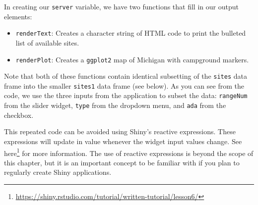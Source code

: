 \documentclass[
]{krantz}
\newenvironment{Shaded}{\begin{snugshade}}{\end{snugshade}}
\newcommand{\ControlFlowTok}[1]{\textcolor[rgb]{0.13,0.29,0.53}{\textbf{#1}}}
\newcommand{\DecValTok}[1]{\textcolor[rgb]{0.00,0.00,0.81}{#1}}
\newcommand{\KeywordTok}[1]{\textcolor[rgb]{0.13,0.29,0.53}{\textbf{#1}}}
\newcommand{\NormalTok}[1]{#1}
\newcommand{\OperatorTok}[1]{\textcolor[rgb]{0.81,0.36,0.00}{\textbf{#1}}}
\newcommand{\StringTok}[1]{\textcolor[rgb]{0.31,0.60,0.02}{#1}}
\providecommand{\tightlist}{%
  \setlength{\itemsep}{0pt}\setlength{\parskip}{0pt}}
\renewcommand{\href}[2]{#2\footnote{\url{#1}}}
\begin{document}
In creating our \texttt{server} variable, we have two functions that fill in our output elements:

\begin{itemize}
\tightlist
\item
  \texttt{renderText}: Creates a character string of HTML code to print the bulleted list of available sites.
\item
  \texttt{renderPlot}: Creates a \texttt{ggplot2} map of Michigan with campground markers.
\end{itemize}

Note that both of these functions contain identical subsetting of the \texttt{sites} data frame into the smaller \texttt{sites1} data frame (see below). As you can see from the code, we use the three inputs from the application to subset the data: \texttt{rangeNum} from the slider widget, \texttt{type} from the dropdown menu, and \texttt{ada} from the checkbox.

This repeated code can be avoided using Shiny's reactive expressions. These expressions will update in value whenever the widget input values change. See \href{https://shiny.rstudio.com/tutorial/written-tutorial/lesson6/}{here} for more information. The use of reactive expressions is beyond the scope of this chapter, but it is an important concept to be familiar with if you plan to regularly create Shiny applications.

\begin{Shaded}
\end{Shaded}
\end{document}
